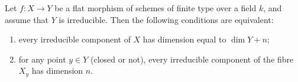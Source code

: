 Let $f: X \to Y$ be a flat morphism of schemes of finite type over a field $k$, and assume that $Y$ is irreducible. Then the following conditions are equivalent:
\begin{enumerate}
\item[(i)] every irreducible component of $X$ has dimension equal to $\dim Y + n$;
\item[(ii)] for any point $y \in Y$ (closed or not), every irreducible component of the fibre $X_y$ has dimension $n$.
\end{enumerate}
